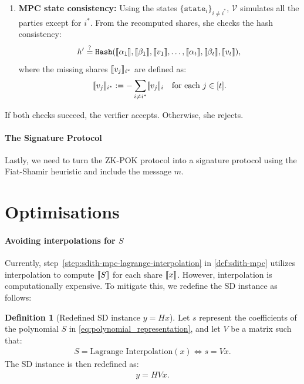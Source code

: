 \documentclass[11pt]{report}
\theoremstyle{definition}
\newtheorem{definition}{Definition}[section]
\theoremstyle{plain}
\begin{document}
\begin{protocol}
\begin{enumerate}
    \item \textbf{MPC state consistency:}
          Using the states \( \{ \texttt{state}_i \}_{i \neq i^*} \), $\mathcal{V}$ simulates all the parties except for \( i^* \). From the recomputed shares, she checks the hash consistency:
          \[
            h' \stackrel{?}{=} \texttt{Hash}(\llbracket \alpha_1 \rrbracket, \llbracket \beta_1 \rrbracket, \llbracket v_1 \rrbracket, \dots, \llbracket \alpha_t \rrbracket, \llbracket \beta_t \rrbracket, \llbracket v_t \rrbracket),
          \]
          where the missing shares \( \llbracket v_j \rrbracket_{i^*} \) are defined as:
          \[
            \llbracket v_j \rrbracket_{i^*} := - \sum_{i \neq i^*} \llbracket v_j \rrbracket_i \quad \text{for each } j \in [t].
          \]
  \end{enumerate}

  \noindent
  If both checks succeed, the verifier accepts. Otherwise, she rejects.
\end{protocol}

\paragraph{The Signature Protocol}
Lastly, we need to turn the ZK-POK protocol into a signature protocol using the Fiat-Shamir heuristic and include the message $m$.

\section{Optimisations}

\paragraph{Avoiding interpolations for $S$}\label{sec:sdith-mpc-avoid-interpolation}
Currently, step~\ref{step:sdith-mpc-lagrange-interpolation} in \autoref{def:sdith-mpc} utilizes interpolation to compute $\llbracket S \rrbracket$ for each share $\llbracket x \rrbracket$. However, interpolation is computationally expensive. To mitigate this, we redefine the SD instance as follows:

\begin{definition}[Redefined SD instance $y = Hx$]
  Let $s$ represent the coefficients of the polynomial $S$ in \autoref{eq:polynomial_representation}, and let $V$ be a matrix such that:
  \begin{align*}
    S = \text{Lagrange Interpolation}(x) \Leftrightarrow s = Vx.
  \end{align*}
  The SD instance is then redefined as:
  \begin{align*}
    y = HVx.
  \end{align*}
\end{definition}
\end{document}
